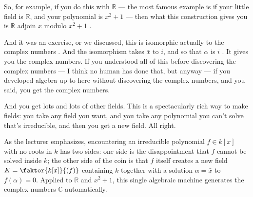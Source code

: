 \begin{speech}[01:17:00 - 01:18:26]
So, for example, if you do this with $\mathbb{R}$ --- the most famous example is if your little field is $\mathbb{R}$, and your polynomial is $x^2 + 1$ --- then what this construction gives you is $\mathbb{R}$ adjoin $x$ modulo $x^2 + 1$ .

And it was an exercise, or we discussed, this is isomorphic actually to the complex numbers . And the isomorphism takes $\bar{x}$ to $i$, and so that $\alpha$ is $i$ . It gives you the complex numbers. If you understood all of this before discovering the complex numbers --- I think no human has done that, but anyway --- if you developed algebra up to here without discovering the complex numbers, and you said,  you get the complex numbers.

And you get lots and lots of other fields. This is a spectacularly rich way to make fields: you take any field you want, and you take any polynomial you can't solve that's irreducible, and then you get a new field. All right.
\end{speech}

\begin{content}
\end{content}

\begin{insight}
As the lecturer emphasizes, encountering an irreducible polynomial $f \in k[x]$ with no roots in $k$ has two sides: one side is the disappointment that $f$ cannot be solved inside $k$; the other side of the coin is that $f$ itself creates a new field $K = \faktor{k[x]}{(f)}$ containing $k$ together with a solution $\alpha = \bar{x}$ to $f(\alpha) = 0$. Applied to $\mathbb{R}$ and $x^2 + 1$, this single algebraic machine generates the complex numbers $\mathbb{C}$ automatically.
\end{insight}


